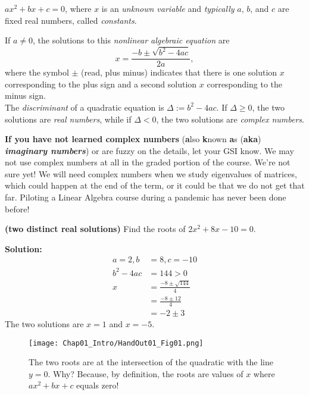 \begin{tcolorbox}[sharp corners, colback=green!30, colframe=green!80!blue, title=\textbf{\large Quadratic Equation}]
$a x^2 + bx + c=0$, where $x$ is an \textit{unknown variable} and \textit{typically} $a$, $b$, and $c$ are fixed real numbers, called \textit{constants}. 

If $a \neq 0$, the solutions to this \textit{nonlinear algebraic equation} are 
$$x = \frac{-b \pm \sqrt{b^2-4ac}}{2a}, $$
where the symbol $\pm$ (read, plus minus) indicates that there is one solution $x$ corresponding to the plus sign and a second solution $x$ corresponding to the minus sign.\\

The \textit{discriminant} of a quadratic equation is $\Delta:=b^2-4ac.$
If $\Delta \ge 0$, the two solutions are \textit{real numbers}, while if  $\Delta <0 $, the two solutions are \textit{complex numbers}.
\end{tcolorbox}

\begin{tcolorbox}[title=\textbf{Complex Numbers}]
\textbf{If you have not learned complex numbers} (\textbf{a}lso \textbf{k}nown \textbf{a}s (\textbf{aka}) \textbf{\em imaginary numbers}) or are fuzzy on the details, let your GSI know. We may not use complex numbers at all in the graded portion of the course. We're not sure yet! We will need complex numbers when we study eigenvalues of matrices, which could happen at the end of the term, or it could be that we do not get that far. Piloting a Linear Algebra course during a pandemic has never been done before!
\end{tcolorbox}

\begin{example} 
\label{ex:QuadDistinctRealSolutions}
\textbf{(two distinct real solutions)} Find the roots of $2x^2 + 8x -10 =0$.


\end{example}

\textbf{Solution:}
\begin{align*}
        a=2, b&=8, c=-10\\
    b^2-4ac&= 144 >0\\
    x&=  \frac{-8 \pm \sqrt{144}}{4} \\
    &=  \frac{-8 \pm 12}{4} \\
    &= -2 \pm 3
    \end{align*}
    The two solutions are $x=1$ and $x=-5$.
\Qed

\begin{figure}[ht!]
\centering
\texttt{[image: Chap01\_Intro/HandOut01\_Fig01.png]}
\caption[]{The two roots are at the intersection of the quadratic with the line $y=0$. Why? Because, by definition, the roots are values of $x$ where $ax^2 + bx + c$ equals zero!}
\end{figure}
    



